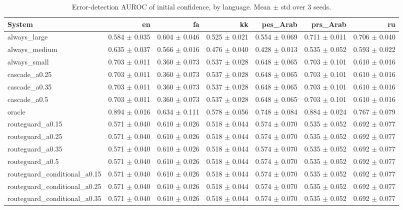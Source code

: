 \begin{table}[t]
\centering
\small
\caption{Error-detection AUROC of initial confidence, by language. Mean $\pm$ std over 3 seeds.}
\label{tab:language_reliability}
\begin{tabular}{lrrrrrr}
\toprule
System & en & fa & kk & pes\_Arab & prs\_Arab & ru \\
\midrule
always\_large & 0.584 $\pm$ 0.035 & 0.604 $\pm$ 0.046 & 0.525 $\pm$ 0.021 & 0.554 $\pm$ 0.069 & 0.711 $\pm$ 0.011 & 0.706 $\pm$ 0.040 \\
always\_medium & 0.635 $\pm$ 0.037 & 0.566 $\pm$ 0.016 & 0.476 $\pm$ 0.040 & 0.428 $\pm$ 0.013 & 0.535 $\pm$ 0.052 & 0.593 $\pm$ 0.022 \\
always\_small & 0.703 $\pm$ 0.011 & 0.360 $\pm$ 0.073 & 0.537 $\pm$ 0.028 & 0.648 $\pm$ 0.065 & 0.703 $\pm$ 0.101 & 0.610 $\pm$ 0.016 \\
cascade\_a0.25 & 0.703 $\pm$ 0.011 & 0.360 $\pm$ 0.073 & 0.537 $\pm$ 0.028 & 0.648 $\pm$ 0.065 & 0.703 $\pm$ 0.101 & 0.610 $\pm$ 0.016 \\
cascade\_a0.35 & 0.703 $\pm$ 0.011 & 0.360 $\pm$ 0.073 & 0.537 $\pm$ 0.028 & 0.648 $\pm$ 0.065 & 0.703 $\pm$ 0.101 & 0.610 $\pm$ 0.016 \\
cascade\_a0.5 & 0.703 $\pm$ 0.011 & 0.360 $\pm$ 0.073 & 0.537 $\pm$ 0.028 & 0.648 $\pm$ 0.065 & 0.703 $\pm$ 0.101 & 0.610 $\pm$ 0.016 \\
oracle & 0.894 $\pm$ 0.016 & 0.634 $\pm$ 0.111 & 0.578 $\pm$ 0.056 & 0.748 $\pm$ 0.084 & 0.884 $\pm$ 0.024 & 0.767 $\pm$ 0.079 \\
routeguard\_a0.15 & 0.571 $\pm$ 0.040 & 0.610 $\pm$ 0.026 & 0.518 $\pm$ 0.044 & 0.574 $\pm$ 0.070 & 0.535 $\pm$ 0.052 & 0.692 $\pm$ 0.077 \\
routeguard\_a0.25 & 0.571 $\pm$ 0.040 & 0.610 $\pm$ 0.026 & 0.518 $\pm$ 0.044 & 0.574 $\pm$ 0.070 & 0.535 $\pm$ 0.052 & 0.692 $\pm$ 0.077 \\
routeguard\_a0.35 & 0.571 $\pm$ 0.040 & 0.610 $\pm$ 0.026 & 0.518 $\pm$ 0.044 & 0.574 $\pm$ 0.070 & 0.535 $\pm$ 0.052 & 0.692 $\pm$ 0.077 \\
routeguard\_a0.5 & 0.571 $\pm$ 0.040 & 0.610 $\pm$ 0.026 & 0.518 $\pm$ 0.044 & 0.574 $\pm$ 0.070 & 0.535 $\pm$ 0.052 & 0.692 $\pm$ 0.077 \\
routeguard\_conditional\_a0.15 & 0.571 $\pm$ 0.040 & 0.610 $\pm$ 0.026 & 0.518 $\pm$ 0.044 & 0.574 $\pm$ 0.070 & 0.535 $\pm$ 0.052 & 0.692 $\pm$ 0.077 \\
routeguard\_conditional\_a0.25 & 0.571 $\pm$ 0.040 & 0.610 $\pm$ 0.026 & 0.518 $\pm$ 0.044 & 0.574 $\pm$ 0.070 & 0.535 $\pm$ 0.052 & 0.692 $\pm$ 0.077 \\
routeguard\_conditional\_a0.35 & 0.571 $\pm$ 0.040 & 0.610 $\pm$ 0.026 & 0.518 $\pm$ 0.044 & 0.574 $\pm$ 0.070 & 0.535 $\pm$ 0.052 & 0.692 $\pm$ 0.077 \\
\bottomrule
\end{tabular}
\end{table}
